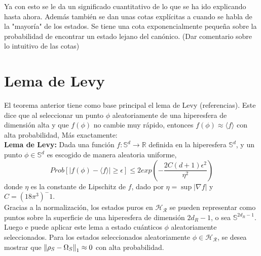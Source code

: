 Ya con esto se le da un significado cuantitativo de lo que se ha ido explicando hasta ahora. Además también se dan unas cotas explícitas a cuando se habla de la "mayoría" de los estados. Se tiene una cota exponencialmente pequeña  sobre la probabilidad de encontrar un estado lejano del canónico. (Dar comentario sobre lo intuitivo de las cotas)\\
\section{Lema de Levy}
El teorema anterior tiene como base principal el lema de Levy (referencias). Este dice que al seleccionar un punto $\phi$ aleatoriamente de una hiperesfera de dimensión alta y que $f(\phi)$ no cambie muy rápido, entonces $f(\phi) \approx \langle f \rangle $ con alta probabilidad, Más exactamente:\\

\textbf{Lema de Levy:} Dada una función $f: \mathbb{S}^d \to \mathbb{R} $ definida en la hiperesfera $\mathbb{S}^d$, y un punto $\phi \in \mathbb{S}^d $ es escogido de manera aleatoria uniforme, 
\begin{equation}
Prob[|f(\phi)- \langle f \rangle| \ge \epsilon ] \le 2exp(-\frac{2C(d+1)\epsilon^2}{\eta^2})
\end{equation}
donde $\eta$ es la constante de Lipschitz de $f$, dado por $\eta= \sup|\nabla f|$ y $C=(18\pi^3)^-1$.\\

Gracias a la normalización, los estados puros en $\mathcal{H_{R}}$ se pueden representar como puntos sobre la superficie de una hiperesfera de dimensión $2d_{R}-1$, o sea  $\mathbb{S}^{2d_{R}-1}$. Luego e puede aplicar este lema a estado cuánticos $\phi$ aleatoriamente seleccionados. Para los estados seleccionados aleatoriamente $\phi \in \mathcal{H_{R}}$, se desea mostrar que $\norm{\rho_{S}- \Omega_{S}}_{1} \approx 0$ con alta probabilidad.\\

